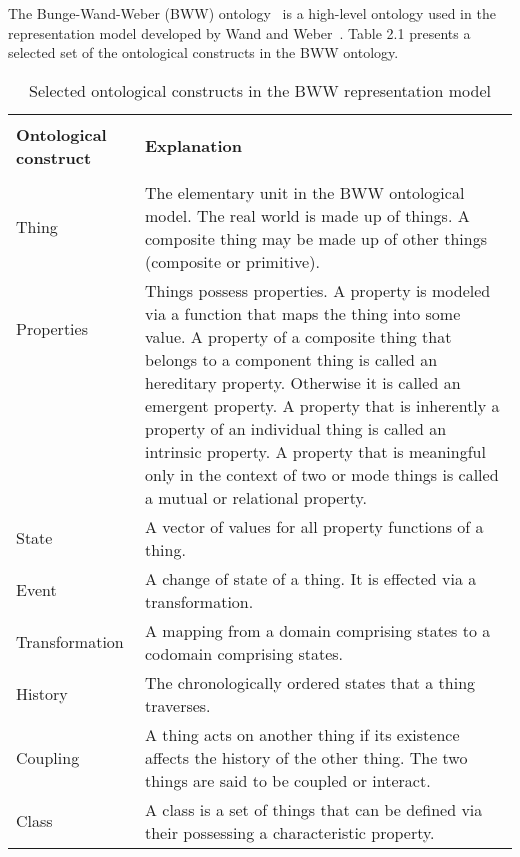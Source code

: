 \documentclass[parskip=full]{uvamscse}
\begin{document}
The Bunge-Wand-Weber (BWW) ontology~\cite{wand1990ontological} is a high-level ontology used in the representation model developed by Wand and Weber~\cite{wand1995deep}. Table 2.1 presents a selected set of the ontological constructs in the BWW ontology.

\begin{center}
\begin{longtable}{ | p{11em} | p{30em} | } 
\caption{Selected ontological constructs in the BWW representation model}\\
\hline
 &  \\
\textbf{Ontological construct} & \textbf{Explanation} \\
 &  \\
\hline
Thing & The elementary unit in the BWW ontological model. The real world is made up of things. A composite thing may be made up of other things (composite or primitive). \\ 
\hline
Properties & \multirow{7}{30em}{Things possess properties. A property is modeled via a function that maps the thing into some value. A property of a composite thing that belongs to a component thing is called an hereditary property. Otherwise it is called an emergent property. A property that is inherently a property of an individual thing is called an intrinsic property. A property that is meaningful only in the context of two or mode things is called a mutual or relational property.} \\ 
 &  \\ 
 &  \\
 &  \\
 &  \\
 &  \\
 &  \\
 \hline
 State & A vector of values for all property functions of a thing. \\
 \hline
 Event & A change of state of a thing. It is effected via a transformation. \\
 \hline
 Transformation & A mapping from a domain comprising states to a codomain comprising states. \\
 \hline
 History & The chronologically ordered states that a thing traverses. \\
 \hline
 Coupling & A thing acts on another thing if its existence affects the history of the other thing. The two things are said to be coupled or interact. \\
 \hline
 Class & A class is a set of things that can be defined via their possessing a characteristic property. \\ 

\end{longtable}
\end{center}
\end{document}
